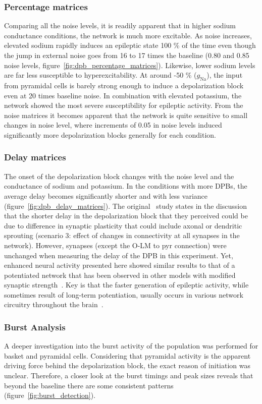 \subsubsection{Percentage matrices}
Comparing all the noise levels, it is readily apparent that in higher sodium conductance conditions, the network is much more excitable.
As noise increases, elevated sodium rapidly induces an epileptic state 100 \% of the time even though the jump in external noise goes from 16 to 17 times the
baseline (0.80 and 0.85 noise levels, figure~\ref{fig:dpb_percentage_matrices}). Likewise, lower sodium levels are far less susceptible to hyperexcitability.
At around -50 \% (\(g_{\text{Na}}\)), the input from pyramidal cells is barely strong enough to induce a depolarization block even at 20 times baseline noise.
In combination with elevated potassium, the network showed the most severe susceptibility for epileptic activity.
From the noise matrices it becomes apparent that the network is quite sensitive to small changes in noise level, where increments of 0.05 in noise levels
induced significantly more depolarization blocks generally for each condition.

\subsubsection{Delay matrices}
The onset of the depolarization block changes with the noise level and the conductance of sodium and potassium.
In the conditions with more DPBs, the average delay becomes significantly shorter and with less variance (figure~\ref{fig:dpb_delay_matrices}).
The original~\textcite{sanjayImpairedDendriticInhibition2015} study states in the discussion that the shorter delay in the depolarization block
that they perceived could be due to difference in synaptic plasticity that could include axonal or dendritic sprouting (scenario 3: effect of changes in connectivity at all
synapses in the network). However, synapses (except the O-LM to pyr connection) were unchanged when measuring the delay of the DPB in this experiment.
Yet, enhanced neural activity presented here showed similar results to that of a potentiated network that has been observed in other models with modified synaptic strength~\parencite{leitePlasticitySynapticStrength2005}.
Key is that the faster generation of epileptic activity, while sometimes result of long-term potentiation, usually occurs in various network circuitry throughout the brain~\parencite{cookePlasticityHumanCentral2006}.

\subsubsection{Burst Analysis}
A deeper investigation into the burst activity of the population was performed for basket and pyramidal cells.
Considering that pyramidal activity is the apparent driving force behind the depolarization block, the exact reason of initiation was unclear.
Therefore, a closer look at the burst timings and peak sizes reveals that beyond the baseline there are some consistent patterns (figure~\ref{fig:burst_detection}).

